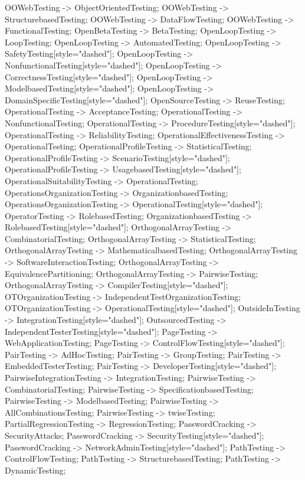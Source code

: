 \documentclass{article}
\begin{document}
{OOWebTesting -> ObjectOrientedTesting;
OOWebTesting -> StructurebasedTesting;
OOWebTesting -> DataFlowTesting;
OOWebTesting -> FunctionalTesting;
OpenBetaTesting -> BetaTesting;
OpenLoopTesting -> LoopTesting;
OpenLoopTesting -> AutomatedTesting;
OpenLoopTesting -> SafetyTesting[style="dashed"];
OpenLoopTesting -> NonfunctionalTesting[style="dashed"];
OpenLoopTesting -> CorrectnessTesting[style="dashed"];
OpenLoopTesting -> ModelbasedTesting[style="dashed"];
OpenLoopTesting -> DomainSpecificTesting[style="dashed"];
OpenSourceTesting -> ReuseTesting;
OperationalTesting -> AcceptanceTesting;
OperationalTesting -> NonfunctionalTesting;
OperationalTesting -> ProcedureTesting[style="dashed"];
OperationalTesting -> ReliabilityTesting;
OperationalEffectivenessTesting -> OperationalTesting;
OperationalProfileTesting -> StatisticalTesting;
OperationalProfileTesting -> ScenarioTesting[style="dashed"];
OperationalProfileTesting -> UsagebasedTesting[style="dashed"];
OperationalSuitabilityTesting -> OperationalTesting;
OperationsOrganizationTesting -> OrganizationbasedTesting;
OperationsOrganizationTesting -> OperationalTesting[style="dashed"];
OperatorTesting -> RolebasedTesting;
OrganizationbasedTesting -> RolebasedTesting[style="dashed"];
OrthogonalArrayTesting -> CombinatorialTesting;
OrthogonalArrayTesting -> StatisticalTesting;
OrthogonalArrayTesting -> MathematicalbasedTesting;
OrthogonalArrayTesting -> SoftwareInteractionTesting;
OrthogonalArrayTesting -> EquivalencePartitioning;
OrthogonalArrayTesting -> PairwiseTesting;
OrthogonalArrayTesting -> CompilerTesting[style="dashed"];
OTOrganizationTesting -> IndependentTestOrganizationTesting;
OTOrganizationTesting -> OperationalTesting[style="dashed"];
OutsideInTesting -> IntegrationTesting[style="dashed"];
OutsourcedTesting -> IndependentTesterTesting[style="dashed"];
PageTesting -> WebApplicationTesting;
PageTesting -> ControlFlowTesting[style="dashed"];
PairTesting -> AdHocTesting;
PairTesting -> GroupTesting;
PairTesting -> EmbeddedTesterTesting;
PairTesting -> DeveloperTesting[style="dashed"];
PairwiseIntegrationTesting -> IntegrationTesting;
PairwiseTesting -> CombinatorialTesting;
PairwiseTesting -> SpecificationbasedTesting;
PairwiseTesting -> ModelbasedTesting;
PairwiseTesting -> AllCombinationsTesting;
PairwiseTesting -> twiseTesting;
PartialRegressionTesting -> RegressionTesting;
PasswordCracking -> SecurityAttacks;
PasswordCracking -> SecurityTesting[style="dashed"];
PasswordCracking -> NetworkAdminTesting[style="dashed"];
PathTesting -> ControlFlowTesting;
PathTesting -> StructurebasedTesting;
PathTesting -> DynamicTesting;
}
\end{document}
